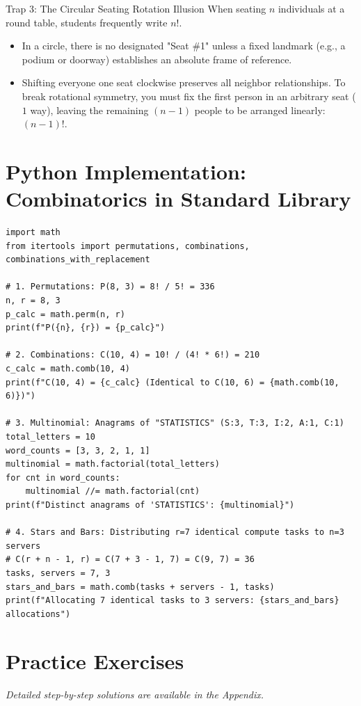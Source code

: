 \begin{trapbox}{Trap 3: The Circular Seating Rotation Illusion}
When seating $n$ individuals at a round table, students frequently write $n!$.
\begin{itemize}
    \item In a circle, there is no designated "Seat \#1" unless a fixed landmark (e.g., a podium or doorway) establishes an absolute frame of reference.
    \item Shifting everyone one seat clockwise preserves all neighbor relationships. To break rotational symmetry, you must fix the first person in an arbitrary seat ($1$ way), leaving the remaining $(n-1)$ people to be arranged linearly: $(n-1)!$.
\end{itemize}
\end{trapbox}

\section{Python Implementation: Combinatorics in Standard Library}

\begin{lstlisting}[caption={Permutations, Combinations, and Multisets in Python}]
import math
from itertools import permutations, combinations, combinations_with_replacement

# 1. Permutations: P(8, 3) = 8! / 5! = 336
n, r = 8, 3
p_calc = math.perm(n, r)
print(f"P({n}, {r}) = {p_calc}")

# 2. Combinations: C(10, 4) = 10! / (4! * 6!) = 210
c_calc = math.comb(10, 4)
print(f"C(10, 4) = {c_calc} (Identical to C(10, 6) = {math.comb(10, 6)})")

# 3. Multinomial: Anagrams of "STATISTICS" (S:3, T:3, I:2, A:1, C:1)
total_letters = 10
word_counts = [3, 3, 2, 1, 1]
multinomial = math.factorial(total_letters)
for cnt in word_counts:
    multinomial //= math.factorial(cnt)
print(f"Distinct anagrams of 'STATISTICS': {multinomial}")

# 4. Stars and Bars: Distributing r=7 identical compute tasks to n=3 servers
# C(r + n - 1, r) = C(7 + 3 - 1, 7) = C(9, 7) = 36
tasks, servers = 7, 3
stars_and_bars = math.comb(tasks + servers - 1, tasks)
print(f"Allocating 7 identical tasks to 3 servers: {stars_and_bars} allocations")
\end{lstlisting}

\newpage
\section{Practice Exercises}
\textit{Detailed step-by-step solutions are available in the Appendix.}

